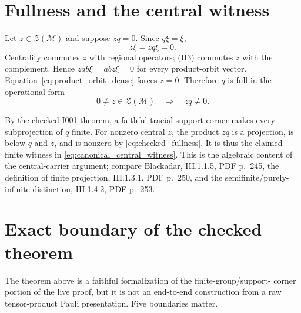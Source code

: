 \documentclass[11pt,reqno]{amsart}
\numberwithin{equation}{section}
\theoremstyle{definition}
\theoremstyle{remark}
\newcommand{\cM}{\mathcal M}
\newcommand{\cZ}{\mathcal Z}
\begin{document}
\section{Fullness and the central witness}
\label{sec:fullness}

Let $z\in\cZ(\cM)$ and suppose $zq=0$.  Since $q\xi=\xi$,
\begin{equation}
  z\xi=zq\xi=0.
  \label{eq:central_nullity}
\end{equation}
Centrality commutes $z$ with regional operators; (H3) commutes $z$ with the
complement.  Hence $zab\xi=abz\xi=0$ for every product-orbit vector.
Equation~\eqref{eq:product_orbit_dense} forces $z=0$.  Therefore $q$ is full
in the operational form
\begin{equation}
  0\neq z\in\cZ(\cM)
  \quad\Longrightarrow\quad
  zq\neq0.
  \label{eq:checked_fullness}
\end{equation}

By the checked I001 theorem, a faithful tracial support corner makes every
subprojection of $q$ finite.  For nonzero central $z$, the product $zq$ is a
projection, is below $q$ and $z$, and is nonzero by
\eqref{eq:checked_fullness}.  It is thus the claimed finite witness in
\eqref{eq:canonical_central_witness}.  This is the algebraic content of the
central-carrier argument; compare Blackadar, III.1.1.5, PDF p.~245, the
definition of finite projection, III.1.3.1, PDF p.~250, and the
semifinite/purely-infinite distinction, III.1.4.2, PDF p.~253.

\section{Exact boundary of the checked theorem}
\label{sec:boundary}

The theorem above is a faithful formalization of the finite-group/support-
corner portion of the live proof, but it is not an end-to-end construction
from a raw tensor-product Pauli presentation.  Five boundaries matter.
\end{document}
